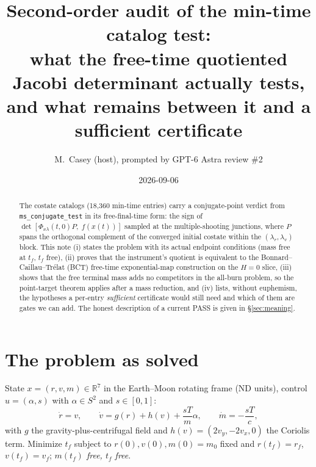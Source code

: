 \documentclass[11pt]{article}
\title{Second-order audit of the min-time catalog test:\\
what the free-time quotiented Jacobi determinant actually tests,\\
and what remains between it and a sufficient certificate}
\author{M.~Casey (host), prompted by GPT-6 Astra review \#2}
\date{2026-09-06}
\theoremstyle{definition}
\newcommand{\R}{\mathbb{R}}
\newcommand{\lv}{\lambda_v}
\newcommand{\lr}{\lambda_r}
\newcommand{\Phixl}{\Phi_{x\lambda}}
\newcommand{\tf}{t_f}
\begin{document}
\maketitle

\begin{abstract}
The costate catalogs (18,360 min-time entries) carry a conjugate-point verdict
from \texttt{ms\_conjugate\_test} in its free-final-time form: the sign of
$\det[\Phixl(t,0)P,\; f(x(t))]$ sampled at the multiple-shooting junctions,
where $P$ spans the orthogonal complement of the converged initial costate
within the $(\lr,\lv)$ block. This note (i) states the problem with its actual
endpoint conditions (mass free at $\tf$, $\tf$ free), (ii) proves that the
instrument's quotient is equivalent to the Bonnard--Caillau--Tr\'elat (BCT)
free-time exponential-map construction on the $H=0$ slice, (iii) shows that the
free terminal mass adds no competitors in the all-burn problem, so the
point-target theorem applies after a mass reduction, and (iv) lists, without
euphemism, the hypotheses a per-entry \emph{sufficient} certificate would still
need and which of them are gates we can add. The honest description of a
current PASS is given in \S\ref{sec:meaning}.
\end{abstract}

\section{The problem as solved}\label{sec:problem}

State $x=(r,v,m)\in\R^7$ in the Earth--Moon rotating frame (ND units), control
$u=(\alpha,s)$ with $\alpha\in S^2$ and $s\in[0,1]$:
\begin{equation}\label{eq:dyn}
\dot r=v,\qquad \dot v=g(r)+h(v)+\frac{sT}{m}\alpha,\qquad \dot m=-\frac{sT}{c},
\end{equation}
with $g$ the gravity-plus-centrifugal field and $h(v)=(2v_y,-2v_x,0)$ the
Coriolis term. Minimize $\tf$ subject to $r(0),v(0),m(0)=m_0$ fixed and
$r(\tf)=r_f$, $v(\tf)=v_f$; \emph{$m(\tf)$ free, $\tf$ free}.
\end{document}
